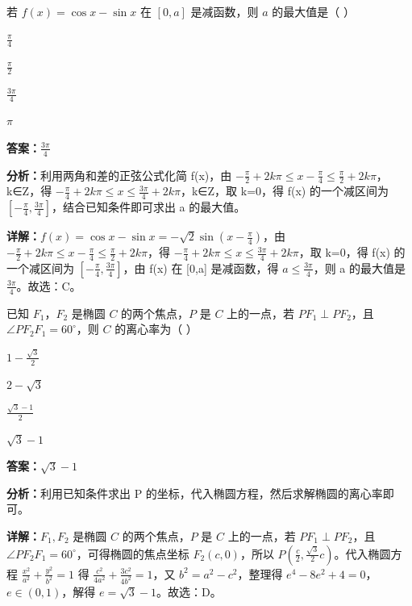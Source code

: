 \begin{question}[points=5]
若 $f(x)=\cos x-\sin x$ 在 $[0,a]$ 是减函数，则 $a$ 的最大值是（ ）
\begin{choices}
  \item $\frac{\pi}{4}$
  \item $\frac{\pi}{2}$
  \item $\frac{3\pi}{4}$
  \item $\pi$
\end{choices}
\begin{solution}
\textbf{答案：}$\frac{3\pi}{4}$

\textbf{分析：}利用两角和差的正弦公式化简 f(x)，由 $-\frac{\pi}{2}+2k\pi\leq x-\frac{\pi}{4}\leq \frac{\pi}{2}+2k\pi$，k∈Z，得 $-\frac{\pi}{4}+2k\pi\leq x\leq \frac{3\pi}{4}+2k\pi$，k∈Z，取 k=0，得 f(x) 的一个减区间为 $[-\frac{\pi}{4},\frac{3\pi}{4}]$，结合已知条件即可求出 a 的最大值。

\textbf{详解：}$f(x)=\cos x-\sin x=-\sqrt{2}\sin(x-\frac{\pi}{4})$，由 $-\frac{\pi}{2}+2k\pi\leq x-\frac{\pi}{4}\leq \frac{\pi}{2}+2k\pi$，得 $-\frac{\pi}{4}+2k\pi\leq x\leq \frac{3\pi}{4}+2k\pi$，取 k=0，得 f(x) 的一个减区间为 $[-\frac{\pi}{4},\frac{3\pi}{4}]$，由 f(x) 在 [0,a] 是减函数，得 $a\leq \frac{3\pi}{4}$，则 a 的最大值是 $\frac{3\pi}{4}$。故选：C。
\end{solution}
\end{question}

\begin{question}[points=5]
已知 $F_1$，$F_2$ 是椭圆 $C$ 的两个焦点，$P$ 是 $C$ 上的一点，若 $PF_1\perp PF_2$，且 $\angle PF_2F_1=60^\circ$，则 $C$ 的离心率为（ ）
\begin{choices}
  \item $1-\frac{\sqrt{3}}{2}$
  \item $2-\sqrt{3}$
  \item $\frac{\sqrt{3}-1}{2}$
  \item $\sqrt{3}-1$
\end{choices}
\begin{solution}
\textbf{答案：}$\sqrt{3}-1$

\textbf{分析：}利用已知条件求出 P 的坐标，代入椭圆方程，然后求解椭圆的离心率即可。

\textbf{详解：}$F_1,F_2$ 是椭圆 $C$ 的两个焦点，$P$ 是 $C$ 上的一点，若 $PF_1\perp PF_2$，且 $\angle PF_2F_1=60^\circ$，可得椭圆的焦点坐标 $F_2(c,0)$，所以 $P(\frac{c}{2},\frac{\sqrt{3}}{2}c)$。代入椭圆方程 $\frac{x^2}{a^2}+\frac{y^2}{b^2}=1$ 得 $\frac{c^2}{4a^2}+\frac{3c^2}{4b^2}=1$，又 $b^2=a^2-c^2$，整理得 $e^4-8e^2+4=0$，$e\in(0,1)$，解得 $e=\sqrt{3}-1$。故选：D。
\end{solution}
\end{question}

